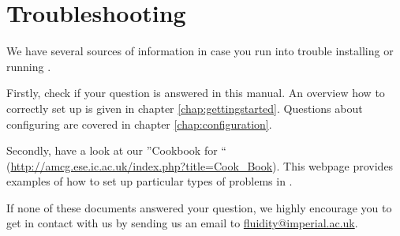 \chapter{Troubleshooting}

We have several sources of information in case you run into trouble installing or running \fluidity.

Firstly, check if your question is answered in this manual. An overview how to correctly set up \fluidity is given in chapter \ref{chap:gettingstarted}.
Questions about configuring \fluidity are covered in chapter \ref{chap:configuration}.

Secondly, have a look at our ''Cookbook for \fluidity`` (\url{http://amcg.ese.ic.ac.uk/index.php?title=Cook_Book}). This webpage provides examples of how to set up particular types of problems in \fluidity.

If none of these documents answered your question, we highly encourage you to get in contact with us by sending us an email to \url{fluidity@imperial.ac.uk}.
